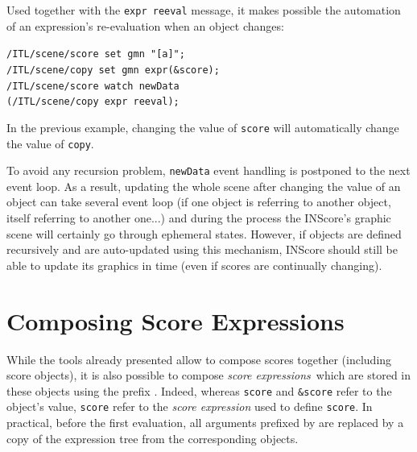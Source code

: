 \documentclass{article}
\newcommand{\OSC}[1]{\texttt{#1}}
\newcommand{\param}[1]{\textcolor{figOrange}{#1}}
\newcommand{\prefix}[1]{\textcolor{figBlue}{#1}}
\newcommand{\sExpr}{\emph{score expressions}}
\newcommand{\lowTilde}{\texttildelow}
\newcommand{\sample}	[1]			{\vspace{-0.2em}\begin{center}\colorbox{mygrey}{\begin{minipage}[t]{0.95\columnwidth} {\small \texttt{#1}}\end{minipage}}\end{center}}
\begin{document}
Used together with the \OSC{expr reeval} message, it makes possible the automation of an expression's re-evaluation when an object changes:
\sample{/ITL/scene/score set gmn "[a]";\\
/ITL/scene/copy set gmn expr(\&score);\\
/ITL/scene/score watch newData\\   
\hspace*{8mm}(/ITL/scene/copy expr reeval);
}
In the previous example, changing the value of \OSC{score} will automatically change the value of \OSC{copy}.

To avoid any recursion problem, \OSC{newData} event handling is postponed to the next event loop. As a result, updating the whole scene after changing the value of an object can take several event loop (if one object is referring to another object, itself referring to another one...) and during the process the INScore's graphic scene will certainly go through ephemeral states. However, if objects are defined recursively and are auto-updated using this mechanism, INScore should still be able to update its graphics in time (even if scores are continually changing).

\section{Composing Score Expressions}
\label{composingExpr}
 While the tools already presented allow to compose scores together (including score objects), it is also possible to compose \sExpr\ which are stored in these objects using the prefix \OSC{\prefix{\lowTilde}}. Indeed, whereas \OSC{\param{score}} and \OSC{\prefix{\&}\param{score}} refer to the object's value, \OSC{\prefix{\lowTilde}\param{score}} refer to the \emph{score expression} used to define \OSC{score}. In practical, before the first evaluation, all arguments prefixed by \OSC{\prefix{\lowTilde}} are replaced by a copy of the expression tree from the corresponding objects.
\end{document}
